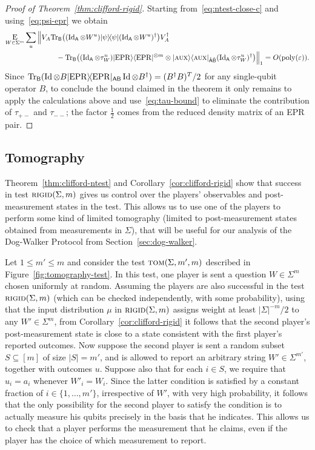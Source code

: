 \begin{proof}[Proof of Theorem~\ref{thm:clifford-rigid}]
Starting from~\eqref{eq:ntest-close-c} and using~\eqref{eq:psi-epr} we obtain 
\begin{align*}\mathop{\textsc{E}}_{W\in\Sigma^{m}}\sum_{u} \Big\|& V_A\mbox{\rm Tr}_{\textsf{B}}\big( (\mathop{\rm Id}\nolimits_{\textsf{A}} \otimes W^{u})|\psi\rangle\!\langle\psi|(\mathop{\rm Id}\nolimits_{\textsf{A}} \otimes W^{u})^\dagger \big) V_A^\dagger \\
&\qquad- \mbox{\rm Tr}_{\textsf{B}}\big( (\mathop{\rm Id}\nolimits_{\textsf{A}} \otimes \tau_W^{u})|{\rm EPR}\rangle\langle{\rm EPR}|^{\otimes m} \otimes |\textsc {aux}\rangle\langle\textsc {aux}|_{\hat{{\textsf{A}}}\hat{{\textsf{B}}}}(\mathop{\rm Id}\nolimits_{\textsf{A}} \otimes \tau_W^{u})^\dagger \big) \Big\|_1 = O(\operatorname{poly}(\varepsilon)).
\end{align*}
Since $\mbox{\rm Tr}_{{\textsf{B}}}( \mathop{\rm Id}\nolimits \otimes B |{\rm EPR}\rangle\!\langle{\rm EPR}|_{{\textsf{AB}}} \mathop{\rm Id}\nolimits\otimes B^\dagger) = (B^\dagger B)^T/2$ for any single-qubit operator $B$, to conclude the bound claimed in the theorem it only remains to apply the calculations above and use~\eqref{eq:tau-bound} to eliminate the contribution of $\tau_{+-}$ and $\tau_{--}$; the factor $\frac{1}{2}$ comes from the reduced density matrix of an EPR pair.
\end{proof}


\subsection{Tomography}
\label{subsec:tomography}
\label{sec: TOM test}

Theorem~\ref{thm:clifford-ntest} and Corollary~\ref{cor:clifford-rigid} show that success in test $\textsc{rigid}(\Sigma,m)$ gives us control over the players' observables and post-measurement states in the test. This allows us to use one of the players to perform some kind of limited tomography (limited to post-measurement states obtained from measurements in $\Sigma$), that will be useful for our analysis of the Dog-Walker Protocol from Section~\ref{sec:dog-walker}.

Let $1\leq m'\leq m$ and consider the test $\textsc{tom}(\Sigma,m',m)$ described in Figure~\ref{fig:tomography-test}. In this test, one player is sent a question $W\in\Sigma^{m}$ chosen uniformly at random. Assuming the players are also successful in the test $\textsc{rigid}(\Sigma,m)$ (which can be checked independently, with some probability), using that the input distribution $\mu$ in $\textsc{rigid}(\Sigma,m)$ assigns weight at least $|\Sigma|^{-m}/2$ to any $W'\in \Sigma^{m}$, from Corollary~\ref{cor:clifford-rigid} it follows that the second player's post-measurement state is close to a state consistent with the first player's reported outcomes. Now suppose the second player is sent a random subset $S\subseteq [m]$ of size $|S|=m'$, and is allowed to report an arbitrary string $W'\in \Sigma^{m'}$, together with outcomes $u$. Suppose also that for each $i\in S$, we require that $u_i=a_i$ whenever $W'_i=W_i$. Since the latter condition is satisfied by a constant fraction of $i\in\{1,\ldots,m'\}$, irrespective of $W'$, with very high probability, it follows that the only possibility for the second player to satisfy the condition is to actually measure his qubits precisely in the basis that he indicates. This allows us to check that a player performs the measurement that he claims, even if the player has the choice of which measurement to report. 

